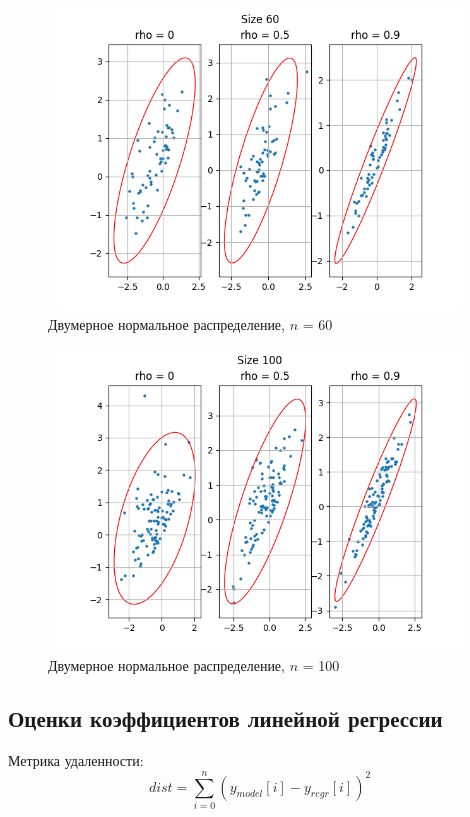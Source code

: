 \begin{figure}[H]
	\centering
	\includegraphics[width = 13cm, height = 8cm]{resources/Ellipse_2.png}
	\caption{Двумерное нормальное распределение, $n$ = 60}
	\label{fig:n60}
\end{figure}

\begin{figure}[H]
	\centering
	\includegraphics[width = 13cm, height = 8cm]{resources/Ellipse_3.png}
	\caption{Двумерное нормальное распределение, $n$ = 100}
	\label{fig:n100}
\end{figure}
\subsection{Оценки коэффициентов линейной регрессии}

\noindent Метрика удаленности: 
\begin{equation} \label{eq:metric}
	dist = \sum_{i=0}^{n}(y_{model}[i]-y_{regr}[i])^2
\end{equation}

